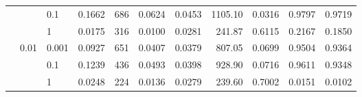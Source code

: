 \begin{table}[H]
{\begin{tabular}{cllrrrrrrrr}
	& & 0.1 & {\cellcolor[HTML]{0A0AFE}} \color[HTML]{F1F1F1} 0.1662 & {\cellcolor[HTML]{5B5BFA}} \color[HTML]{F1F1F1} 686 & {\cellcolor[HTML]{0000FF}} \color[HTML]{F1F1F1} 0.0624 & {\cellcolor[HTML]{0808FF}} \color[HTML]{F1F1F1} 0.0453 & {\cellcolor[HTML]{0505FF}} \color[HTML]{F1F1F1} 1105.10 & {\cellcolor[HTML]{E8E8F3}} \color[HTML]{000000} 0.0316 & {\cellcolor[HTML]{0404FF}} \color[HTML]{F1F1F1} 0.9797 & {\cellcolor[HTML]{0606FF}} \color[HTML]{F1F1F1} 0.9719 \\
	& & 1 & {\cellcolor[HTML]{F0F0F3}} \color[HTML]{000000} 0.0175 & {\cellcolor[HTML]{CECEF5}} \color[HTML]{000000} 316 & {\cellcolor[HTML]{F0F0F3}} \color[HTML]{000000} 0.0100 & {\cellcolor[HTML]{EFEFF3}} \color[HTML]{000000} 0.0281 & {\cellcolor[HTML]{F0F0F3}} \color[HTML]{000000} 241.87 & {\cellcolor[HTML]{1F1FFD}} \color[HTML]{F1F1F1} 0.6115 & {\cellcolor[HTML]{BFBFF5}} \color[HTML]{000000} 0.2167 & {\cellcolor[HTML]{C6C6F5}} \color[HTML]{000000} 0.1850 \\
	& \multirow{3}{*}{0.01} & 0.001 & {\cellcolor[HTML]{7C7CF9}} \color[HTML]{F1F1F1} 0.0927 & {\cellcolor[HTML]{6565FA}} \color[HTML]{F1F1F1} 651 & {\cellcolor[HTML]{6464FA}} \color[HTML]{F1F1F1} 0.0407 & {\cellcolor[HTML]{6B6BFA}} \color[HTML]{F1F1F1} 0.0379 & {\cellcolor[HTML]{5656FB}} \color[HTML]{F1F1F1} 807.05 & {\cellcolor[HTML]{DBDBF4}} \color[HTML]{000000} 0.0699 & {\cellcolor[HTML]{0A0AFE}} \color[HTML]{F1F1F1} 0.9504 & {\cellcolor[HTML]{0E0EFE}} \color[HTML]{F1F1F1} 0.9364 \\
	& & 0.1 & {\cellcolor[HTML]{4B4BFB}} \color[HTML]{F1F1F1} 0.1239 & {\cellcolor[HTML]{A9A9F6}} \color[HTML]{000000} 436 & {\cellcolor[HTML]{3B3BFC}} \color[HTML]{F1F1F1} 0.0493 & {\cellcolor[HTML]{5151FB}} \color[HTML]{F1F1F1} 0.0398 & {\cellcolor[HTML]{3535FC}} \color[HTML]{F1F1F1} 928.90 & {\cellcolor[HTML]{DADAF4}} \color[HTML]{000000} 0.0716 & {\cellcolor[HTML]{0808FF}} \color[HTML]{F1F1F1} 0.9611 & {\cellcolor[HTML]{0E0EFE}} \color[HTML]{F1F1F1} 0.9348 \\
	& & 1 & {\cellcolor[HTML]{E5E5F3}} \color[HTML]{000000} 0.0248 & {\cellcolor[HTML]{EBEBF3}} \color[HTML]{000000} 224 & {\cellcolor[HTML]{E0E0F4}} \color[HTML]{000000} 0.0136 & {\cellcolor[HTML]{F0F0F3}} \color[HTML]{000000} 0.0279 & {\cellcolor[HTML]{F0F0F3}} \color[HTML]{000000} 239.60 & {\cellcolor[HTML]{0000FF}} \color[HTML]{F1F1F1} 0.7002 & {\cellcolor[HTML]{F0F0F3}} \color[HTML]{000000} 0.0151 & {\cellcolor[HTML]{F0F0F3}} \color[HTML]{000000} 0.0102 \\
	\bottomrule[2.5pt]
\end{tabular}
}
\end{table}
